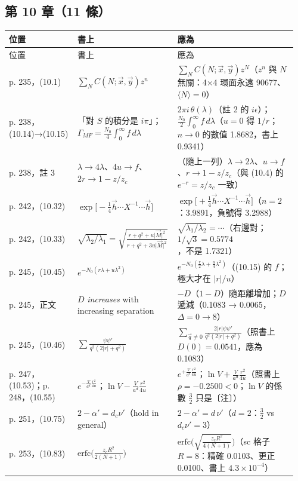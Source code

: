 \subsection{第 10 章（11 條）}
{\footnotesize\renewcommand{\arraystretch}{1.1}\setlength{\tabcolsep}{4pt}
\begin{longtable}{@{}>{\raggedright\arraybackslash}p{0.21\linewidth}>{\raggedright\arraybackslash}p{0.34\linewidth}>{\raggedright\arraybackslash}p{0.41\linewidth}@{}}
\toprule 位置 & 書上 & 應為\\ \midrule\endfirsthead
\toprule 位置 & 書上 & 應為\\ \midrule\endhead
\bottomrule\endfoot
p. 235，(10.1) & $\sum_NC(N;\vec x,\vec y)z^n$ & $\sum_NC(N;\vec x,\vec y)z^N$（$z^n$ 與 $N$ 無關：4×4 環面永遠 90677、$\langle N\rangle=0$）\\
p. 238，(10.14)→(10.15) & 「對 $S$ 的積分是 $i\pi$」；$\Gamma_{MF}=\frac{N_0}4\int_0^\infty f\,d\lambda$ & $2\pi i\,\theta(\lambda)$（註 2 的 $i\epsilon$）；$\frac{N_0}2\int_0^\infty f\,d\lambda$（$u=0$ 得 $1/r$；$n\to0$ 的數值 1.8682，書上 0.9341）\\
p. 238，註 3 & $\lambda\to4\lambda$、$4u\to f$、$2r\to1-z/z_c$ & （隨上一列）$\lambda\to2\lambda$、$u\to f$、$r\to1-z/z_c$（與 (10.4) 的 $e^{-r}=z/z_c$ 一致）\\
p. 242，(10.32) & $\exp\big[-\frac14\vec h\cdots X^{-1}\cdots\vec h\big]$ & $\exp\big[+\frac14\vec h\cdots X^{-1}\cdots\vec h\big]$（$n=2$：3.9891，負號得 3.2988）\\
p. 242，(10.33) & $\sqrt{\lambda_2/\lambda_1}=\sqrt{\frac{r+q^2+u\lvert\vec M\rvert^2}{r+q^2+3u\lvert\vec M\rvert^2}}$ & $\sqrt{\lambda_1/\lambda_2}=\cdots$（右邊對；$1/\sqrt3=0.5774$，不是 1.7321）\\
p. 245，(10.45) & $e^{-N_0(r\lambda+u\lambda^2)}$ & $e^{-N_0(\frac r2\lambda+\frac u4\lambda^2)}$（(10.15) 的 $f$；極大才在 $\lvert r\rvert/u$）\\
p. 245，正文 & $D$ \emph{increases} with increasing separation & $-D$（$1-D$）隨距離增加；$D$ 遞減（0.1083 → 0.0065，$\Delta=0\to8$）\\
p. 245，(10.46) & $\sum\frac{\psi\psi'}{q^2(2\lvert r\rvert+q^2)}$ & $\sum_{\vec q\ne0}\frac{2\lvert r\rvert\psi\psi'}{q^2(2\lvert r\rvert+q^2)}$（照書上 $D(0)=0.0541$，應為 0.1083）\\
p. 247，(10.53)；p. 248，(10.55) & $e^{-\frac V{a^d}\frac{r^2}{4u}}$；$\ln V-\frac V{a^d}\frac{r^2}{4u}$ & $e^{+\frac V{a^d}\frac{r^2}{4u}}$；$\ln V+\frac V{a^d}\frac{r^2}{4u}$（照書上 $\rho=-0.2500<0$；$\ln V$ 的係數 $\frac32$ 只是〔注〕）\\
p. 251，(10.75) & $2-\alpha'=d_c\nu'$（hold in general） & $2-\alpha'=d\,\nu'$（$d=2$：$\frac32$ vs $d_c\nu'=3$）\\
p. 253，(10.83) & $\mathrm{erfc}\big(\frac{z_cR^2}{2(N+1)}\big)$ & $\mathrm{erfc}\big(\sqrt{\frac{z_cR^2}{4(N+1)}}\big)$（sc 格子 $R=8$：精確 0.0103、更正 0.0100、書上 $4.3\times10^{-4}$）\\
\end{longtable}}

